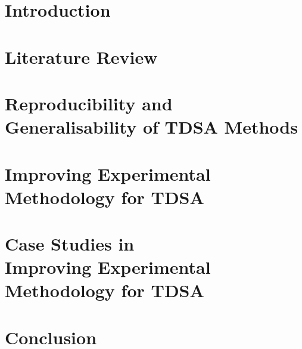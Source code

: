 \documentclass[twoside,11pt, a4paper]{report}
\begin{document}
\listoffigures

\clearpage

\listoftables

\clearpage
\pagestyle{main}




\FloatBarrier
\chapter{Introduction}
\label{chapter:introduction}


\FloatBarrier
\chapter{Literature Review}
\label{chapter:lit_review}


\FloatBarrier
\chapter{Reproducibility and Generalisability of TDSA Methods}
\label{chapter:reproducibility}


\FloatBarrier
\chapter[Improving Experimental Methodology for TDSA]{Improving Experimental\\Methodology for TDSA}
\label{chapter:methodology}


\FloatBarrier
\chapter[Case Studies in Improving Experimental Methodology for TDSA]{Case Studies in\\Improving Experimental\\Methodology for TDSA}
\label{chapter:case_study_methodology}


\FloatBarrier
\chapter{Conclusion}
\label{chapter:conclusion}

\end{document}

